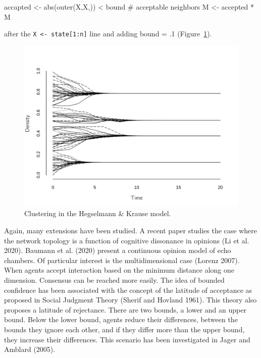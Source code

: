\documentclass[
  a4paper,
  DIV=11,
  numbers=noendperiod,
  oneside]{scrreprt}
\newenvironment{Shaded}{\begin{snugshade}}{\end{snugshade}}
\newcommand{\CommentTok}[1]{\textcolor[rgb]{0.37,0.37,0.37}{#1}}
\newcommand{\FunctionTok}[1]{\textcolor[rgb]{0.28,0.35,0.67}{#1}}
\newcommand{\NormalTok}[1]{\textcolor[rgb]{0.00,0.23,0.31}{#1}}
\newcommand{\OtherTok}[1]{\textcolor[rgb]{0.00,0.23,0.31}{#1}}
\newcommand{\SpecialCharTok}[1]{\textcolor[rgb]{0.37,0.37,0.37}{#1}}
\newcommand{\StringTok}[1]{\textcolor[rgb]{0.13,0.47,0.30}{#1}}
\begin{document}
\begin{Shaded}
\begin{Highlighting}[]
\NormalTok{accapted }\OtherTok{\textless{}{-}} \FunctionTok{abs}\NormalTok{(}\FunctionTok{outer}\NormalTok{(X,X,}\StringTok{\textquotesingle{}{-}\textquotesingle{}}\NormalTok{)) }\SpecialCharTok{\textless{}}\NormalTok{ bound }\CommentTok{\# acceptable neighbors}
\NormalTok{M }\OtherTok{\textless{}{-}}\NormalTok{ accepted }\SpecialCharTok{*}\NormalTok{ M}
\end{Highlighting}
\end{Shaded}

after the \texttt{X\ \textless{}-\ state{[}1:n{]}} line and adding bound
= .1 (Figure~\ref{fig-ch7-img9-old-97}).

\begin{figure}

{\centering \includegraphics{media/ch7/fig-ch7-img9-old-97.png}

}

\caption{\label{fig-ch7-img9-old-97}Clustering in the Hegselmann \&
Krause model.}

\end{figure}

Again, many extensions have been studied. A recent paper studies the
case where the network topology is a function of cognitive dissonance in
opinions (Li et al. 2020). Baumann et al. (2020) present a continuous
opinion model of echo chambers. Of particular interest is the
multidimensional case (Lorenz 2007). When agents accept interaction
based on the minimum distance along one dimension. Consensus can be
reached more easily. The idea of bounded confidence has been associated
with the concept of the latitude of acceptance as proposed in Social
Judgment Theory (Sherif and Hovland 1961). This theory also proposes a
latitude of rejectance. There are two bounds, a lower and an upper
bound. Below the lower bound, agents reduce their differences, between
the bounds they ignore each other, and if they differ more than the
upper bound, they increase their differences. This scenario has been
investigated in Jager and Amblard (2005).
\end{document}
